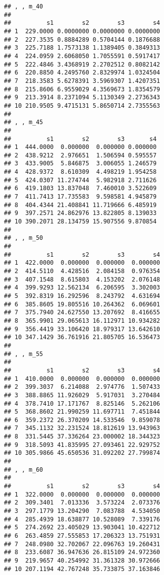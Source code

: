 \documentclass[
]{article}
\begin{document}
\begin{verbatim}
## , , m_40
## 
##          s1        s2        s3        s4
## 1  229.0000 0.0000000 0.0000000 0.0000000
## 2  227.3535 0.8884289 0.5704144 0.1876688
## 3  225.7188 1.7573138 1.1389405 0.3849313
## 4  224.0959 2.6068050 1.7055591 0.5917417
## 5  222.4846 3.4368919 2.2702512 0.8082142
## 6  220.8850 4.2495760 2.8329974 1.0324504
## 7  218.3583 5.6278391 3.5969307 1.4207351
## 8  215.8606 6.9559029 4.3569673 1.8354579
## 9  213.3914 8.2371094 5.1130349 2.2736343
## 10 210.9505 9.4715131 5.8650714 2.7355563
## 
## , , m_45
## 
##          s1        s2        s3       s4
## 1  444.0000  0.000000  0.000000 0.000000
## 2  438.9212  2.976651  1.506594 0.595557
## 3  433.9005  5.846875  3.006055 1.246579
## 4  428.9372  8.610309  4.498219 1.954258
## 5  424.0307 11.274744  5.982918 2.711626
## 6  419.1803 13.837048  7.460010 3.522609
## 7  411.7413 17.735583  9.598581 4.945879
## 8  404.4344 21.408841 11.719666 6.485919
## 9  397.2571 24.862976 13.822805 8.139033
## 10 390.2071 28.134759 15.907556 9.870854
## 
## , , m_50
## 
##          s1        s2        s3        s4
## 1  422.0000  0.000000  0.000000  0.000000
## 2  414.5110  4.428516  2.084158  0.976354
## 3  407.1548  8.615803  4.153202  2.076148
## 4  399.9293 12.562134  6.206595  3.302003
## 5  392.8319 16.292596  8.243792  4.631694
## 6  385.8605 19.805516 10.264362  6.069601
## 7  375.7940 24.627550 13.207692  8.416655
## 8  365.9901 29.065613 16.112971 10.934282
## 9  356.4419 33.106420 18.979317 13.642610
## 10 347.1429 36.761916 21.805705 16.536473
## 
## , , m_55
## 
##          s1        s2        s3        s4
## 1  410.0000  0.000000  0.000000  0.000000
## 2  399.3037  6.214088  2.974776  1.507433
## 3  388.8865 11.926029  5.917031  3.270484
## 4  378.7410 17.171767  8.825146  5.262106
## 5  368.8602 21.990259 11.697711  7.451844
## 6  359.2372 26.370209 14.533546  9.859078
## 7  345.1132 32.231524 18.812619 13.943963
## 8  331.5445 37.336264 23.000002 18.344323
## 9  318.5093 41.835995 27.093461 22.929752
## 10 305.9866 45.650536 31.092202 27.799874
## 
## , , m_60
## 
##          s1        s2        s3        s4
## 1  322.0000  0.000000  0.000000  0.000000
## 2  309.3401  7.013336  3.573224  2.073376
## 3  297.1779 13.204290  7.083788  4.534050
## 4  285.4939 18.638877 10.528089  7.339176
## 5  274.2692 23.405029 13.903041 10.422712
## 6  263.4859 27.555853 17.206323 13.751931
## 7  248.0980 32.702067 22.096763 19.260431
## 8  233.6087 36.947636 26.815109 24.972360
## 9  219.9657 40.254992 31.361328 30.972666
## 10 207.1194 42.767248 35.733875 37.163846

\end{verbatim}
\end{document}
